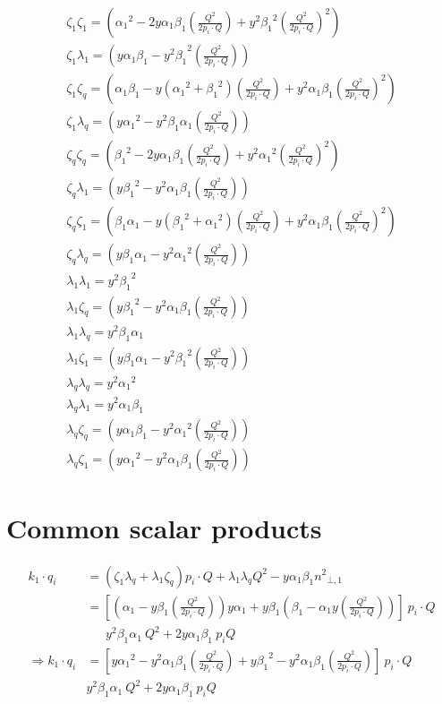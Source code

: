 \begin{equation}
	\begin{aligned}
	\zeta_1\zeta_1=({\alpha_1}^2 -2y\alpha_1 \beta_1(\frac{Q^2}{2p_i \cdot Q})+y^2{\beta_1}^2(\frac{Q^2}{2p_i \cdot Q})^2)\\
	\zeta_1\lambda_1=(y\alpha_1\beta_1 -{y^2\beta_1}^2(\frac{Q^2}{2p_i \cdot Q}))\\
	\zeta_1\zeta_q=(\alpha_1\beta_1-y({\alpha_1}^2+{\beta_1}^2) (\frac{Q^2}{2p_i \cdot Q})+y^2{\alpha_1}{\beta_1}(\frac{Q^2}{2p_i \cdot Q})^2)\\
	\zeta_1\lambda_q=(y{\alpha_1}^2 -y^2\beta_1\alpha_1(\frac{Q^2}{2p_i \cdot Q}))\\
	\zeta_q\zeta_q=	({\beta_1}^2 -2y\alpha_1\beta_1 (\frac{Q^2}{2p_i \cdot Q})+ y^2{\alpha_1}^2 (\frac{Q^2}{2p_i \cdot Q})^2) \\
	\zeta_q\lambda_1=(y{\beta_1}^2 -y^2\alpha_1 \beta_1(\frac{Q^2}{2p_i \cdot Q}))\\
	\zeta_q\zeta_1=(\beta_1\alpha_1-y({\beta_1}^2+{\alpha_1}^2)(\frac{Q^2}{2p_i \cdot Q})+y^2\alpha_1\beta_1 (\frac{Q^2}{2p_i \cdot Q})^2)\\
	\zeta_q\lambda_q=(y\beta_1\alpha_1 -y^2{\alpha_1}^2(\frac{Q^2}{2p_i \cdot Q}))\\
	\lambda_1\lambda_1=y^2{\beta_1}^2\\
	\lambda_1\zeta_q=(y{\beta_1}^2 -y^2\alpha_1 \beta_1(\frac{Q^2}{2p_i \cdot Q}))\\
	\lambda_1\lambda_q=y^2\beta_1\alpha_1\\
	\lambda_1\zeta_1=(y\beta_1\alpha_1 -y^2{\beta_1}^2(\frac{Q^2}{2p_i \cdot Q}))\\
	\lambda_q\lambda_q=y^2{\alpha_1}^2\\
	\lambda_q\lambda_1=y^2\alpha_1\beta_1\\
	\lambda_q\zeta_q=(y\alpha_1\beta_1 -y^2{\alpha_1}^2 (\frac{Q^2}{2p_i \cdot Q}))\\
	\lambda_q\zeta_1=(y{\alpha_1}^2 -y^2\alpha_1\beta_1(\frac{Q^2}{2p_i \cdot Q}))
    \end{aligned}
\end{equation}
\section{Common scalar products}
\begin{equation}
	\begin{aligned}	
k_1 \cdot q_i &= (\zeta_1 \lambda_q + \lambda_1 \zeta_q)p_i \cdot Q+\lambda_1 \lambda_q Q^2 -y\alpha_1\beta_1 {n^{2}}_{\bot,1}\\
	&=[(\alpha_1 -y\beta_1(\frac{Q^2}{2p_i \cdot Q}))y\alpha_1+y\beta_1(\beta_1 -\alpha_1 y(\frac{Q^2}{2p_i \cdot Q}))]\:p_i \cdot Q\\
	&\:\:\:\:\:\:\:y^2\beta_1\alpha_1\: Q^2+2y\alpha_1\beta_1\:p_iQ\\
\Rightarrow	k_1 \cdot q_i &=[y{\alpha_1}^2 -y^2\alpha_1\beta_1(\frac{Q^2}{2p_i \cdot Q})+y {\beta_1}^2-y^2\alpha_1\beta_1(\frac{Q^2}{2p_i \cdot Q})]\:p_i\cdot Q\\
	&y^2\beta_1\alpha_1\: Q^2+2y\alpha_1\beta_1\:p_iQ\\	
    \end{aligned}
\end{equation}

